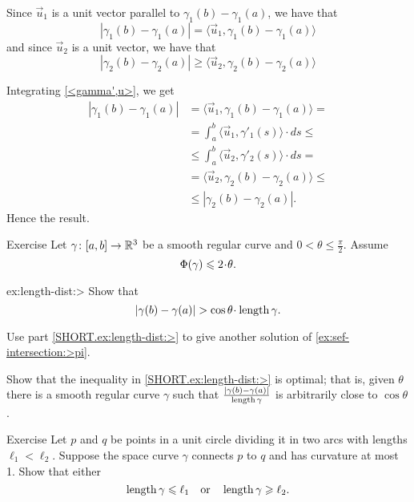 Since $\vec u_1$ is a unit vector parallel to $\gamma_1(b)-\gamma_1(a)$, we have that
\[|\gamma_1(b)-\gamma_1(a)|=\langle \vec u_1,\gamma_1(b)-\gamma_1(a)\rangle\]
and since $\vec u_2$ is a unit vector, we have that
\[|\gamma_2(b)-\gamma_2(a)|\ge\langle \vec u_2,\gamma_2(b)-\gamma_2(a)\rangle\]

Integrating \ref{<gamma',u>}, we get 
\begin{align*}
|\gamma_1(b)-\gamma_1(a)|&=\langle \vec u_1,\gamma_1(b)-\gamma_1(a)\rangle=
\\
&=\int_a^b\langle \vec u_1,\gamma'_1(s)\rangle\cdot ds \le 
\\
&\le\int_a^b\langle \vec u_2,\gamma'_2(s)\rangle\cdot ds =
\\
&=\langle \vec u_2,\gamma_2(b)-\gamma_2(a)\rangle \le
\\
&\le |\gamma_2(b)-\gamma_2(a)|.
\end{align*}
Hence the result.\qeds

\begin{thm}{Exercise}\label{ex:length-dist}
Let $\gamma\colon[a,b]\to \mathbb{R}^3$ be a smooth regular curve and $0<\theta\le\tfrac\pi2$.
Assume 
\[\tc\gamma\le 2\cdot\theta.\]

\begin{subthm}{ex:length-dist:>} Show that
\[|\gamma(b)-\gamma(a)|> \cos\theta\cdot\length\gamma.\]
\end{subthm}

\begin{subthm}{} Use part \ref{SHORT.ex:length-dist:>} to give another solution of \ref{ex:sef-intersection:>pi}.
\end{subthm}

\begin{subthm}{} Show that the inequality in \ref{SHORT.ex:length-dist:>} is optimal; that is, given 
$\theta$ there is a smooth regular curve $\gamma$ such that $\frac{|\gamma(b)-\gamma(a)|}{\mathop{\rm length}\nolimits\gamma}$ is arbitrarily close to $\cos\theta$.
\end{subthm}

\end{thm}



\begin{thm}{Exercise}\label{ex:schwartz}
Let $p$ and $q$ be points in a unit circle dividing it in two arcs with lengths $\ell_1<\ell_2$.
Suppose the space curve $\gamma$ connects $p$ to $q$ and has curvature at most 1. Show that either
\[\mathop{\rm length}\nolimits \gamma\leqslant \ell_1
\quad\text{or}\quad
\mathop{\rm length}\nolimits \gamma\geqslant \ell_2.
\]
\end{thm} %

